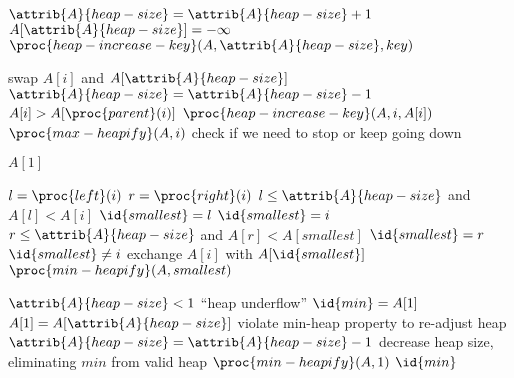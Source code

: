 \documentclass{article}
\begin{document}
\begin{codebox}
\li $\attrib{A}{heap-size} = \attrib{A}{heap-size} + 1$
\li $A[\attrib{A}{heap-size}] = -\infty$
\li $\proc{heap-increase-key}(A, \attrib{A}{heap-size}, key)$
\end{codebox}

\begin{codebox}
\li swap $A[i]$ and $A[\attrib{A}{heap-size}]$
\li $\attrib{A}{heap-size} = \attrib{A}{heap-size} - 1$
\li \If $A[i] > A[\proc{parent}(i)]$
\li \Then
        $\proc{heap-increase-key}(A, i, A[i])$
    \End
\li \Else
\li \Then
        $\proc{max-heapify}(A, i)$ \Comment check if we need to stop or keep going down
    \End
\end{codebox}

\newpage

\begin{codebox}
\li \Return $A[1]$
\end{codebox}

\begin{codebox}
\li $l = \proc{left}(i)$
\li $r = \proc{right}(i)$
\li \If $l \leq \attrib{A}{heap-size}$ and $A[l] < A[i]$
\li     \Then
            $\id{smallest} = l$
\li     \Else
            $\id{smallest} = i$
        \End
\li \If $r \leq \attrib{A}{heap-size}$ and $A[r] < A[smallest]$
\li     \Then
            $\id{smallest} = r$
        \End
\li \If $\id{smallest} \neq i$
\li     \Then
            exchange $A[i]$ with $A[\id{smallest}]$
\li         $\proc{min-heapify}(A, smallest)$
        \End
\end{codebox}

\begin{codebox}
\li \If $\attrib{A}{heap-size} < 1$
\li     \Then
            \Error ``heap underflow''
        \End
\li $\id{min} = A[1]$
\li $A[1] = A[\attrib{A}{heap-size}]$ \Comment violate min-heap property to re-adjust heap
\li $\attrib{A}{heap-size} = \attrib{A}{heap-size} - 1$ \Comment decrease heap size, eliminating $min$ from valid heap
\li $\proc{min-heapify}(A, 1)$
\li \Return $\id{min}$
\end{codebox}
\end{document}
